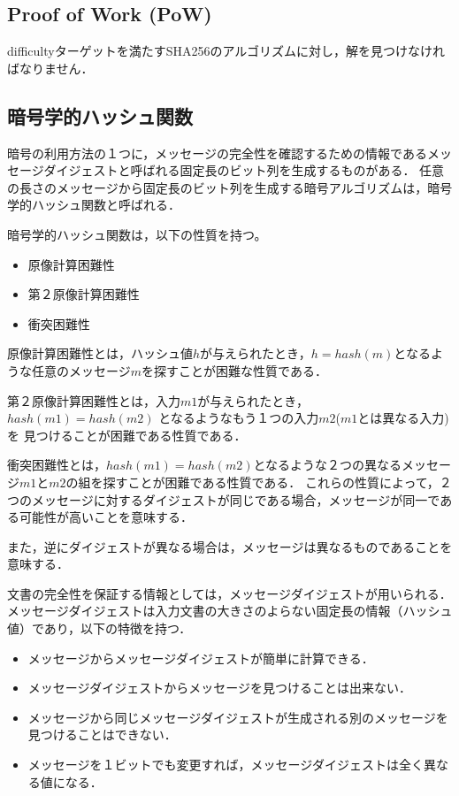 \documentclass[a4paper,12pt]{jsarticle}
\begin{document}
      \subsection{Proof of Work (PoW)}
difficultyターゲットを満たすSHA256のアルゴリズムに対し，解を見つけなければなりません．

      \subsection{暗号学的ハッシュ関数} %

暗号の利用方法の１つに，メッセージの完全性を確認するための情報であるメッセージダイジェストと呼ばれる固定長のビット列を生成するものがある．
任意の長さのメッセージから固定長のビット列を生成する暗号アルゴリズムは，暗号学的ハッシュ関数と呼ばれる．

暗号学的ハッシュ関数は，以下の性質を持つ。
\begin{itemize}
  \item 原像計算困難性
  \item 第２原像計算困難性
  \item 衝突困難性
\end{itemize}

原像計算困難性とは，ハッシュ値$h$が与えられたとき，$ h = hash(m)$となるような任意のメッセージ$m$を探すことが困難な性質である．

第２原像計算困難性とは，入力$m1$が与えられたとき，$ hash(m1) = hash(m2)$ となるようなもう１つの入力$m2$($m1$とは異なる入力)を
見つけることが困難である性質である．

衝突困難性とは，$hash(m1)= hash(m2)$となるような２つの異なるメッセージ$m1$と$m2$の組を探すことが困難である性質である．
これらの性質によって，２つのメッセージに対するダイジェストが同じである場合，メッセージが同一である可能性が高いことを意味する．

また，逆にダイジェストが異なる場合は，メッセージは異なるものであることを意味する．

文書の完全性を保証する情報としては，メッセージダイジェストが用いられる．
メッセージダイジェストは入力文書の大きさのよらない固定長の情報（ハッシュ値）であり，以下の特徴を持つ．

\begin{itemize}
  \item メッセージからメッセージダイジェストが簡単に計算できる．
  \item メッセージダイジェストからメッセージを見つけることは出来ない．
  \item メッセージから同じメッセージダイジェストが生成される別のメッセージを見つけることはできない．
  \item メッセージを１ビットでも変更すれば，メッセージダイジェストは全く異なる値になる．
\end{itemize}
\end{document}

